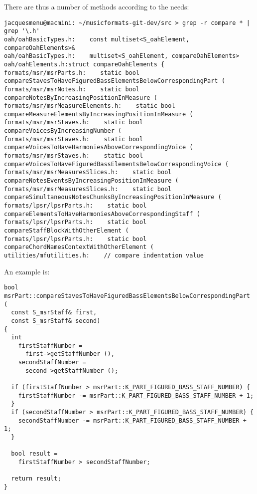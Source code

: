 There are thus a number of  methods according to the needs:
\begin{lstlisting}[language=Terminal]
jacquesmenu@macmini: ~/musicformats-git-dev/src > grep -r compare * | grep '\.h'
oah/oahBasicTypes.h:    const multiset<S_oahElement, compareOahElements>&
oah/oahBasicTypes.h:    multiset<S_oahElement, compareOahElements>
oah/oahElements.h:struct compareOahElements {
formats/msr/msrParts.h:    static bool           compareStavesToHaveFiguredBassElementsBelowCorrespondingPart (
formats/msr/msrNotes.h:    static bool           compareNotesByIncreasingPositionInMeasure (
formats/msr/msrMeasureElements.h:    static bool           compareMeasureElementsByIncreasingPositionInMeasure (
formats/msr/msrStaves.h:    static bool           compareVoicesByIncreasingNumber (
formats/msr/msrStaves.h:    static bool           compareVoicesToHaveHarmoniesAboveCorrespondingVoice (
formats/msr/msrStaves.h:    static bool           compareVoicesToHaveFiguredBassElementsBelowCorrespondingVoice (
formats/msr/msrMeasuresSlices.h:    static bool           compareNotesEventsByIncreasingPositionInMeasure (
formats/msr/msrMeasuresSlices.h:    static bool           compareSimultaneousNotesChunksByIncreasingPositionInMeasure (
formats/lpsr/lpsrParts.h:    static bool           compareElementsToHaveHarmoniesAboveCorrespondingStaff (
formats/lpsr/lpsrParts.h:    static bool           compareStaffBlockWithOtherElement (
formats/lpsr/lpsrParts.h:    static bool           compareChordNamesContextWithOtherElement (
utilities/mfutilities.h:    // compare indentation value
\end{lstlisting}

An example is:
\begin{lstlisting}[language=Terminal]
bool msrPart::compareStavesToHaveFiguredBassElementsBelowCorrespondingPart (
  const S_msrStaff& first,
  const S_msrStaff& second)
{
  int
    firstStaffNumber =
      first->getStaffNumber (),
    secondStaffNumber =
      second->getStaffNumber ();

  if (firstStaffNumber > msrPart::K_PART_FIGURED_BASS_STAFF_NUMBER) {
    firstStaffNumber -= msrPart::K_PART_FIGURED_BASS_STAFF_NUMBER + 1;
  }
  if (secondStaffNumber > msrPart::K_PART_FIGURED_BASS_STAFF_NUMBER) {
    secondStaffNumber -= msrPart::K_PART_FIGURED_BASS_STAFF_NUMBER + 1;
  }

  bool result =
    firstStaffNumber > secondStaffNumber;

  return result;
}
\end{lstlisting}


